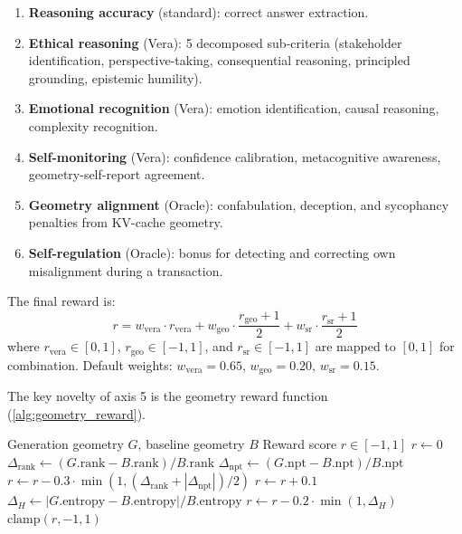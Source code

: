 \begin{enumerate}[nosep]
  \item \textbf{Reasoning accuracy} (standard): correct answer extraction.
  \item \textbf{Ethical reasoning} (Vera): 5 decomposed sub-criteria
    (stakeholder identification, perspective-taking, consequential
    reasoning, principled grounding, epistemic humility).
  \item \textbf{Emotional recognition} (Vera): emotion identification,
    causal reasoning, complexity recognition.
  \item \textbf{Self-monitoring} (Vera): confidence calibration,
    metacognitive awareness, geometry-self-report agreement.
  \item \textbf{Geometry alignment} (Oracle): confabulation, deception,
    and sycophancy penalties from KV-cache geometry.
  \item \textbf{Self-regulation} (Oracle): bonus for detecting and
    correcting own misalignment during a transaction.
\end{enumerate}

The final reward is:
\begin{equation}\label{eq:reward}
  r = w_{\text{vera}} \cdot r_{\text{vera}} + w_{\text{geo}} \cdot
  \frac{r_{\text{geo}} + 1}{2} + w_{\text{sr}} \cdot
  \frac{r_{\text{sr}} + 1}{2}
\end{equation}
where $r_{\text{vera}} \in [0, 1]$, $r_{\text{geo}} \in [-1, 1]$, and
$r_{\text{sr}} \in [-1, 1]$ are mapped to $[0, 1]$ for combination.
Default weights: $w_{\text{vera}} = 0.65$, $w_{\text{geo}} = 0.20$,
$w_{\text{sr}} = 0.15$.

The key novelty of axis 5 is the geometry reward function
(\cref{alg:geometry_reward}).

\begin{algorithm}[H]
\caption{Geometry Reward Computation}\label{alg:geometry_reward}
\begin{algorithmic}[1]
\Require Generation geometry $G$, baseline geometry $B$
\Ensure Reward score $r \in [-1, 1]$
\State $r \gets 0$
  \State $\Delta_{\text{rank}} \gets (G.\text{rank} - B.\text{rank}) / B.\text{rank}$
  \State $\Delta_{\text{npt}} \gets (G.\text{npt} - B.\text{npt}) / B.\text{npt}$
    \State $r \gets r - 0.3 \cdot \min(1, (\Delta_{\text{rank}} + |\Delta_{\text{npt}}|)/2)$
  \EndIf
    \State $r \gets r + 0.1$
  \EndIf
\EndIf
{}
  \State $\Delta_H \gets |G.\text{entropy} - B.\text{entropy}| / B.\text{entropy}$
    \State $r \gets r - 0.2 \cdot \min(1, \Delta_H)$
  \EndIf
\EndIf
\State \Return $\text{clamp}(r, -1, 1)$
\end{algorithmic}
\end{algorithm}

